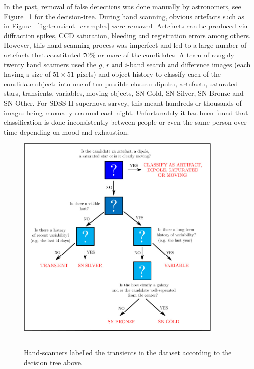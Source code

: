 In the past, removal of false detections was done manually by astronomers, see Figure ~\ref{fig:hand_scanning} for the decision-tree.
During hand scanning, obvious artefacts such as in Figure ~\ref{fig:transient_examples} were removed.
Artefacts can be produced via diffraction spikes, CCD saturation, bleeding and registration errors among others.
However, this hand-scanning process was imperfect and led to a large number of artefacts that constituted $70\%$ or more of the candidates.
A team of roughly twenty hand scanners used the $g$, $r$ and $i$-band search and difference images (each having a size of $51 \times 51$ pixels) and object history to classify each of the candidate objects into one of ten possible classes: dipoles, artefacts, saturated stars, transients, variables, moving objects, SN Gold, SN Silver, SN Bronze and SN Other\citep{frieman2007sloan}.
For SDSS-II supernova survey, this meant hundreds or thousands of images being manually scanned each night.
Unfortunately it has been found that classification is done inconsistently between people or even the same person over time depending on mood and exhaustion.
\begin{figure}[htbp]
	\centering
		\includegraphics[width = 0.9\textwidth]{./Figures/lise_paper_hand_scanning.jpg}
		\rule{35em}{0.5pt}
	\caption[Hand-scanning]{Hand-scanners labelled the transients in the dataset according to the decision tree above.}
	\label{fig:hand_scanning}
\end{figure}

